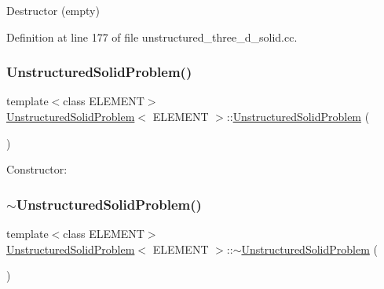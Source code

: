 Destructor (empty) 



Definition at line 177 of file unstructured\+\_\+three\+\_\+d\+\_\+solid.\+cc.

\mbox{\label{classUnstructuredSolidProblem_a18ce02b6e4bbc86403c9e1b32c095772}} 
\subsubsection{\texorpdfstring{Unstructured\+Solid\+Problem()}{UnstructuredSolidProblem()}\hspace{0.1cm}{\footnotesize\ttfamily [2/2]}}
{\footnotesize\ttfamily template$<$class E\+L\+E\+M\+E\+NT$>$ \\
\hyperlink{classUnstructuredSolidProblem}{Unstructured\+Solid\+Problem}$<$ E\+L\+E\+M\+E\+NT $>$\+::\hyperlink{classUnstructuredSolidProblem}{Unstructured\+Solid\+Problem} (\begin{DoxyParamCaption}{ }\end{DoxyParamCaption})}



Constructor\+: 

\mbox{\label{classUnstructuredSolidProblem_a25fe105d949498bf8f7c15aff96a7d00}} 
\subsubsection{\texorpdfstring{$\sim$\+Unstructured\+Solid\+Problem()}{~UnstructuredSolidProblem()}\hspace{0.1cm}{\footnotesize\ttfamily [2/2]}}
{\footnotesize\ttfamily template$<$class E\+L\+E\+M\+E\+NT$>$ \\
\hyperlink{classUnstructuredSolidProblem}{Unstructured\+Solid\+Problem}$<$ E\+L\+E\+M\+E\+NT $>$\+::$\sim$\hyperlink{classUnstructuredSolidProblem}{Unstructured\+Solid\+Problem} (\begin{DoxyParamCaption}{ }\end{DoxyParamCaption})\hspace{0.3cm}{\ttfamily [inline]}}



